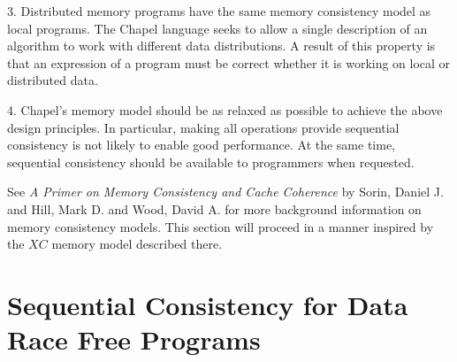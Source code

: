 3. Distributed memory programs have the same memory consistency model as local programs. The Chapel language seeks to allow a single description of an algorithm to work with different data distributions. A result of this property is that an expression of a program must be correct whether it is working on local or distributed data.

4. Chapel's memory model should be as relaxed as possible to achieve the above design principles. In particular, making all operations provide sequential consistency is not likely to enable good performance. At the same time, sequential consistency should be available to programmers when requested.

See \textit{A Primer on Memory Consistency and Cache Coherence} by Sorin,
Daniel J. and Hill, Mark D. and Wood, David A. for more background information
on memory consistency models. This section will proceed in a manner inspired by the $XC$ memory model described there.

\section{Sequential Consistency for Data Race Free Programs}


